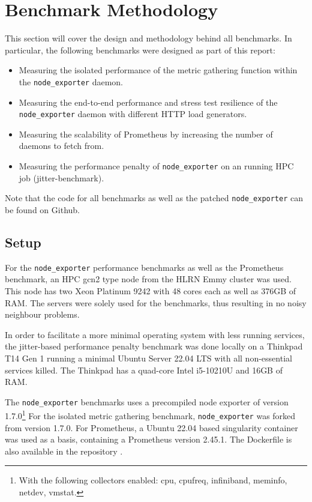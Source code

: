 \section{Benchmark Methodology}
This section will cover the design and methodology behind all benchmarks. In particular, the following
benchmarks were designed as part of this report:

\begin{itemize}
  \item Measuring the isolated performance of the metric gathering function within the \texttt{node\_exporter} daemon.
  \item Measuring the end-to-end performance and stress test resilience of the \texttt{node\_exporter} daemon with different HTTP load generators.
  \item Measuring the scalability of Prometheus by increasing the number of daemons to fetch from.
  \item Measuring the performance penalty of \texttt{node\_exporter} on an running \ac{HPC} job (jitter-benchmark).
\end{itemize}

Note that the code for all benchmarks \cite{my_repo} as well as the patched \texttt{node\_exporter} \cite{my_node_exporter}
can be found on Github.

\subsection{Setup}

For the \texttt{node\_exporter} performance benchmarks as well as the Prometheus benchmark, an \ac{HPC} 
gcn2 type node from the HLRN Emmy cluster was used. This node has two Xeon Platinum 9242 with 48 cores each
as well as 376GB of RAM. The servers were solely used for the benchmarks, thus resulting in
no noisy neighbour problems.

In order to facilitate a more minimal operating system with less running services, the jitter-based 
performance penalty benchmark was done locally on a Thinkpad T14 Gen 1 running a minimal
Ubuntu Server 22.04 LTS with all non-essential services killed. The Thinkpad has a quad-core Intel i5-10210U and 16GB of RAM.

The \texttt{node\_exporter} benchmarks uses a precompiled node exporter of version 1.7.0\footnote{With the following collectors enabled: cpu, cpufreq, infiniband, meminfo, netdev, vmstat.}
For the isolated metric gathering benchmark, 
\texttt{node\_exporter} was forked from version 1.7.0. For Prometheus, a Ubuntu 22.04 based singularity
container was used as a basis, containing a Prometheus version 2.45.1. The Dockerfile is also available
in the repository \cite{my_repo}.

